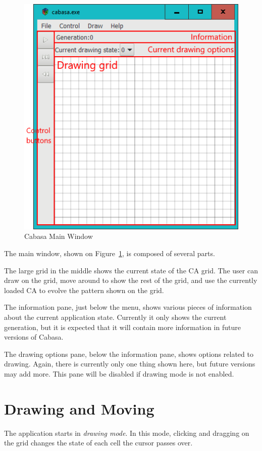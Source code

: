 \documentclass[oneside,a4paper]{memoir}
\begin{document}
\begin{figure}[h]
  \centering
  \includegraphics[scale=.8]{screenshot.png}
  \caption{Cabasa Main Window}
  \label{fig:mainwin}
\end{figure}

The main window, shown on Figure~\ref{fig:mainwin}, is composed of several parts.

The large grid in the middle shows the current state of the CA grid.
The user can draw on the grid, move around to show the rest of the grid, and use the currently loaded CA to evolve the pattern shown on the grid.

The information pane, just below the menu, shows various pieces of information about the current application state.
Currently it only shows the current generation,
  but it is expected that it will contain more information in future versions of Cabasa.

The drawing options pane, below the information pane, shows options related to drawing.
Again, there is currently only one thing shown here, but future versions may add more.
This pane will be disabled if drawing mode is not enabled.

\section{Drawing and Moving}
\label{sec:drming}

The application starts in \emph{drawing mode}.
In this mode, clicking and dragging on the grid changes the state of each cell the cursor passes over.
\end{document}
